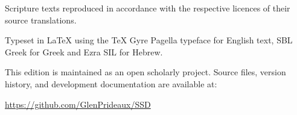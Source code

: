 \vspace{2em}

Scripture texts reproduced in accordance with the respective licences
of their source translations.

\vspace{2em}

Typeset in \LaTeX{} using the \TeX{} Gyre Pagella typeface for English
text, SBL Greek for Greek and Ezra SIL for Hebrew.

This edition is maintained as an open scholarly project.
Source files, version history, and development documentation are available at:

\href{https://github.com/GlenPrideaux/SSD}{https://github.com/GlenPrideaux/SSD}

